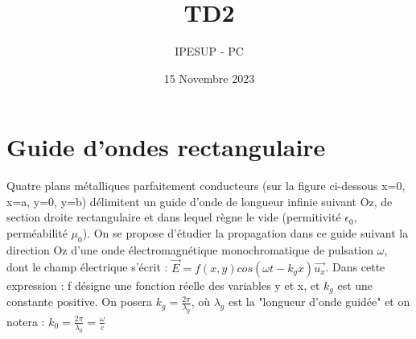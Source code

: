 \documentclass{article}
\title{TD2}
\author{IPESUP - PC }
\date{15 Novembre 2023}
\begin{document}
\maketitle



\section{Guide d'ondes rectangulaire}
Quatre plans métalliques parfaitement conducteurs (sur la figure ci-dessous x=0, x=a, y=0,
y=b) délimitent un guide d’onde de longueur infinie suivant Oz, de section droite rectangulaire et dans lequel règne le vide (permitivité $\epsilon_0$, perméabilité $\mu_0$).
On se propose d’étudier la propagation dans ce guide suivant la direction Oz d’une onde
électromagnétique monochromatique de pulsation $\omega$, dont le champ électrique s’écrit :
$\vec{E}=f(x,y)cos(\omega t-k_gx)\vec{u_x}$. Dans cette expression : f désigne une fonction réelle des 
variables y et x, et $ k_g$ est une constante positive. On posera $k_g=\frac{2\pi}{\lambda_g}$, où $\lambda_g$ est  la  "longueur d’onde
guidée" et on notera : $k_0 = \frac{2\pi}{\lambda_0}=\frac{\omega}{c}$
\end{document}
